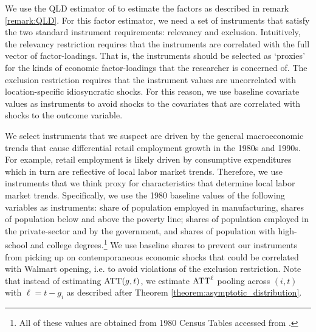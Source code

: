 \begin{figure}
\end{figure}

We use the QLD estimator of \citet{Ahn_Lee_Schmidt_2013} to estimate the factors as described in remark \ref{remark:QLD}. For this factor estimator, we need a set of instruments that satisfy the two standard instrument requirements: relevancy and exclusion. Intuitively, the relevancy restriction requires that the instruments are correlated with the full vector of factor-loadings. That is, the instruments should be selected as `proxies' for the kinds of economic factor-loadings that the researcher is concerned of. The exclusion restriction requires that the instrument values are uncorrelated with location-specific idiosyncratic shocks. For this reason, we use baseline covariate values as instruments to avoid shocks to the covariates that are correlated with shocks to the outcome variable. 

We select instruments that we suspect are driven by the general macroeconomic trends that cause differential retail employment growth in the 1980s and 1990s. For example, retail employment is likely driven by consumptive expenditures which in turn are reflective of local labor market trends. Therefore, we use instruments that we think proxy for characteristics that determine local labor market trends. Specifically, we use the 1980 baseline values of the following variables as instruments: share of population employed in manufacturing, shares of population below and above the poverty line; shares of population employed in the private-sector and by the government, and shares of population with high-school and college degrees.\footnote{All of these values are obtained from 1980 Census Tables accessed from \citet{manson2020ipums}.} We use baseline shares to prevent our instruments from picking up on contemporaneous economic shocks that could be correlated with Walmart opening, i.e. to avoid violations of the exclusion restriction. Note that instead of estimating $\text{ATT}(g,t)$, we estimate $\text{ATT}^\ell$ pooling across $(i, t)$ with $\ell = t - g_i$ as described after Theorem \ref{theorem:asymptotic_distribution}.


